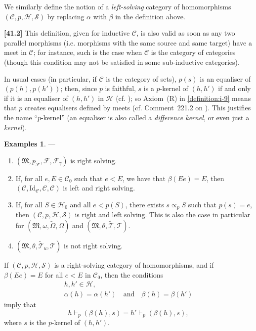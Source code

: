 \documentclass[a4paper,fleqn]{article}
\theoremstyle{plain}
\newenvironment{proposition}[1]
  {\renewcommand\theinnerproposition{#1}\innerproposition}
  {\endinnerproposition}
\theoremstyle{definition}
\newtheorem*{examples}{Examples}
\newenvironment{longcomm}[1]
  {\noindent\textbf{[#1]}\rmfamily}
  {}
\newcommand{\oldpage}[1]{{\marginpar{\footnotesize$\bigg\vert$\,\,\,\,\textit{p.~#1}}}}
\newcommand{\textand}{\quad\text{and}\quad}
\newcommand{\CC}{\mathcal{C}}
\newcommand{\HH}{\mathcal{H}}
\renewcommand{\SS}{\mathcal{S}}
\newcommand{\MM}{\mathfrak{M}}
\newcommand{\FF}{\mathcal{F}}
\newcommand{\TT}{\mathcal{T}}
\newcommand{\tTT}{\widetilde{\TT}}
\newcommand{\subs}{\mathrel{\propto}}
\newcommand{\Id}{\mathrm{Id}}
\begin{document}
We similarly define the notion of a \emph{left-solving} category of homomorphisms $(\CC,p,\HH,\SS)$ by replacing $\alpha$ with $\beta$ in the definition above.

\begin{longcomm}{41.2}
  This definition, given for inductive $\CC$, is also valid as soon as any two parallel morphisms (i.e. morphisms with the same source and same target) have a meet in $\CC$;
  for instance, such is the case when $\CC$ is the category of categories (though this condition may not be satisfied in some sub-inductive categories).

  In usual cases (in particular, if $\CC$ is the category of sets), $p(s)$ is an equaliser of $(p(h),p(h'))$;
  then, since $p$ is faithful, $s$ is a $p$-kernel of $(h,h')$ if and only if it is an equaliser of $(h,h')$ in $\HH$ (cf. \cite[Proposition~3.1]{coll109});
  so Axiom~(R) in \cref{definition:i-9} means that $p$ creates equalisers defined by meets (cf. Comment~221.2 on \cite{coll100}).
  This justifies the name ``$p$-kernel'' (an equaliser is also called a \emph{difference kernel}, or even just a \emph{kernel}).
\end{longcomm}

\begin{examples}
  ---
  \begin{enumerate}
    \item[\normalfont(1)]
      $(\MM,p_\FF,\FF,\FF_\gamma)$ is right solving.

    \item[\normalfont(2)]
      If, for all $e,E\in\CC_0$ such that $e<E$, we have that $\beta(Ee)=E$, then $(\CC,\Id_\CC,\CC,\CC)$ is left and right solving.

    \item[\normalfont(3)]
      If, for all $S\in\HH_0$ and all $e<p(S)$, there exists $s\subs_p S$ such that $p(s)=e$, then $(\CC,p,\HH,\SS)$ is right and left solving.
      This is also the case in particular for $(\MM,\omega,\widetilde{\Omega},\Omega)$ and $(\MM,\theta,\tTT,\TT)$.

    \item[\normalfont(4)]
      \oldpage{370}
      $(\MM,\theta,\tTT_u,\TT)$ is not right solving.
  \end{enumerate}
\end{examples}

\begin{proposition}{11}
\label{proposition:i-11}
  If $(\CC,p,\HH,\SS)$ is a right-solving category of homomorphisms, and if $\beta(Ee)=E$ for all $e<E$ in $\CC_0$, then the conditions
  \[
    \begin{gathered}
      h,h'\in\HH,
    \\\alpha(h)=\alpha(h')
      \textand
      \beta(h)=\beta(h')
    \end{gathered}
  \]
  imply that
  \[
    h\vdash_p(\beta(h),s)
    = h'\vdash_p(\beta(h),s),
  \]
  where $s$ is the $p$-kernel of $(h,h')$.
\end{proposition}
\end{document}
